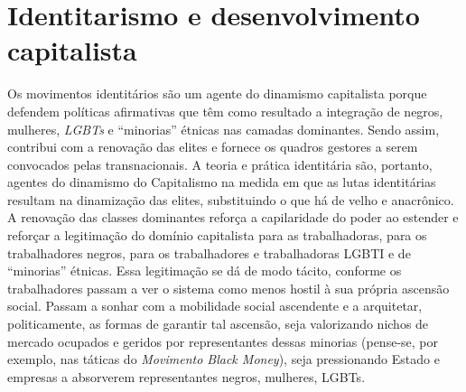 \chapter{Identitarismo e desenvolvimento capitalista}

Os movimentos identitários são um agente do dinamismo capitalista porque
defendem políticas afirmativas que têm como resultado a integração de
negros, mulheres, \emph{LGBTs} e ``minorias'' étnicas nas camadas
dominantes. Sendo assim, contribui com a renovação das elites e fornece
os quadros gestores a serem convocados pelas transnacionais. A teoria e
prática identitária são, portanto, agentes do dinamismo do Capitalismo
na medida em que as lutas identitárias resultam na dinamização das
elites, substituindo o que há de velho e anacrônico. A renovação das
classes dominantes reforça a capilaridade do poder ao estender e
reforçar a legitimação do domínio capitalista para as trabalhadoras,
para os trabalhadores negros, para os trabalhadores e trabalhadoras
LGBTI e de ``minorias'' étnicas. Essa legitimação se dá de modo tácito,
conforme os trabalhadores passam a ver o sistema como menos hostil à sua
própria ascensão social. Passam a sonhar com a mobilidade social
ascendente e a arquitetar, politicamente, as formas de garantir tal
ascensão, seja valorizando nichos de mercado ocupados e geridos por
representantes dessas minorias (pense-se, por exemplo, nas táticas do
\emph{Movimento Black Money}), seja pressionando Estado e empresas a
absorverem representantes negros, mulheres, LGBTs.

